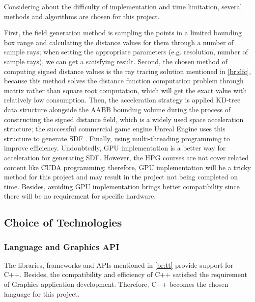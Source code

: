 Considering about the difficulty of implementation and time limitation, several methods and algorithms are chosen for this project. 

\hspace*{\fill}

First, the field generation method is sampling the points in a limited bounding box range and calculating the distance values for them through a number of sample rays; when setting the appropriate parameters (e.g. resolution, number of sample rays), we can get a satisfying result. Second, the chosen method of computing signed distance values is the ray tracing solution \cite{AkenineMller2005FastMS} mentioned in \ref{br:dfc}, because this method solves the distance function computation problem through matrix rather than square root computation, which will get the exact value with relatively low consumption. Then, the acceleration strategy is applied KD-tree data structure alongside the AABB bounding volume during the process of constructing the signed distance field, which is a widely used space acceleration structure; the successful commercial game engine Unreal Engine uses this structure to generate SDF \cite{uesdf}. Finally, using multi-threading programming to improve efficiency. Undoubtedly, GPU implementation is a better way for acceleration for generating SDF. However, the HPG courses are not cover related content like CUDA programming; therefore, GPU implementation will be a tricky method for this project and may result in the project not being completed on time. Besides, avoiding GPU implementation brings better compatibility since there will be no requirement for specific hardware.

\subsection{Choice of Technologies}
\label{br:ctpl}

\subsubsection{Language and Graphics API}

The libraries, frameworks and APIs mentioned in \ref{br:tt} provide support for C++. Besides, the compatibility and efficiency of C++ satisfied the requirement of Graphics application development. Therefore, C++ becomes the chosen language for this project.

\hspace*{\fill}

